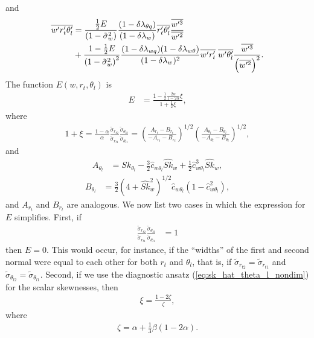 and
\begin{align}
    \label{eq:wprtpthlp_E}
    \overline{w' r_t' \theta_l'}
    &= \frac{\frac{1}{2} E}{\left( 1 - \tilde{\sigma}_w^2 \right)}
    \frac{(1-\delta \lambda_{\theta q})} {(1 - \delta \lambda_w)}
    \overline{r_t' \theta_l'} \frac{\overline{w'^3}}{\overline{w'^2}} \nonumber\\
    &+ \frac{1 - \frac{1}{2} E}{\left( 1 - \tilde{\sigma}_w^2 \right)^2}
    \frac{(1-\delta \lambda_{w q})(1-\delta \lambda_{w \theta})}{(1 - \delta \lambda_w)^2}
    \overline{w' r_t'} \; \overline{w' \theta_l'} \frac{\overline{w'^3}}{\left( \overline{w'^2} \right)^2}.
\end{align}
The function $E(w,r_t,\theta_l)$ is
\begin{align}
    \label{eq:E}
    E &= \frac{1 - \frac{1}{2} \frac{2\alpha}{1-2\alpha} \xi}{1 + \frac{1}{2} \xi},
\end{align}
where
\begin{align}
    1 + \xi
    = \frac{1-\alpha}{\alpha} \frac{\tilde{\sigma}_{r_{t2}}}{\tilde{\sigma}_{r_{t1}}} \frac{ \tilde{\sigma}_{\theta_{l2}}}{\tilde{\sigma}_{\theta_{l1}}}
    = \left(\frac{A_{r_t} - B_{r_t}}{-A_{r_t} - B_{r_t}}\right)^{1/2} \left(\frac{A_{\theta_l} - B_{\theta_l}}{-A_{\theta_l} - B_{\theta_l}}\right)^{1/2},
\end{align}
and
\begin{align}
    \label{eq:A_thl}
    A_{\theta_l}
    &= Sk_{\theta_l} - \frac{3}{2} \widehat{c}_{w\theta_l} \widehat{Sk}_w + \frac{1}{2} \widehat{c}_{w\theta_l}^3 \widehat{Sk}_w,
\end{align}
\begin{align}
    B_{\theta_l}
    &= \frac{3}{2} \left(4 + \widehat{Sk}_w^2 \right)^{1/2} \widehat{c}_{w\theta_l} \left(1 - \widehat{c}_{w\theta_l}^2\right),
\end{align}
and $A_{r_t}$ and $B_{r_t}$ are analogous.
We now list two cases in which the expression for $E$ simplifies.
First, if
\begin{align*}
    \frac{\tilde{\sigma}_{r_{t2}}}{\tilde{\sigma}_{r_{t1}}} \frac{\tilde{\sigma}_{\theta_{l2}}}{\tilde{\sigma}_{\theta_{l1}}}
    &= 1
\end{align*}
then $E=0$.
This would occur, for instance,
if the \enquote{widths} of the first and second normal were equal to each other for both $r_t$ and $\theta_l$,
that is, if $\tilde{\sigma}_{r_{t2}} = \tilde{\sigma}_{r_{t1}}$
and $\tilde{\sigma}_{\theta_{l2}} = \tilde{\sigma}_{\theta_{l1}}$.
Second, if we use the diagnostic ansatz (\cref{eq:sk_hat_theta_l_nondim}) for the scalar skewnesses, then
\begin{align}
    \label{eq:xi}
    \xi = \frac{1 - 2 \zeta}{\zeta},
\end{align}
where
\begin{align}
    \label{eq:zeta}
    \zeta = \alpha + \frac{1}{3} \beta \left(1 - 2 \alpha \right).
\end{align}

